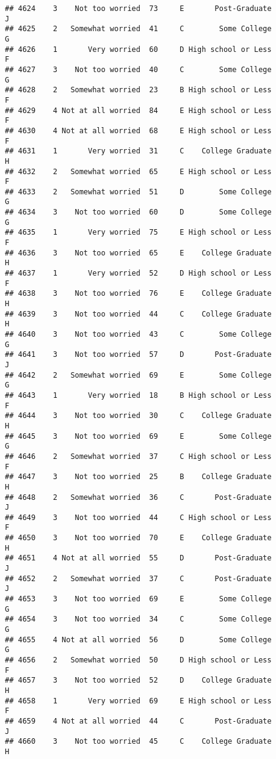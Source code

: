 \documentclass[
]{article}
\begin{document}
\begin{verbatim}
## 4624    3    Not too worried  73     E       Post-Graduate         J
## 4625    2   Somewhat worried  41     C        Some College         G
## 4626    1       Very worried  60     D High school or Less         F
## 4627    3    Not too worried  40     C        Some College         G
## 4628    2   Somewhat worried  23     B High school or Less         F
## 4629    4 Not at all worried  84     E High school or Less         F
## 4630    4 Not at all worried  68     E High school or Less         F
## 4631    1       Very worried  31     C    College Graduate         H
## 4632    2   Somewhat worried  65     E High school or Less         F
## 4633    2   Somewhat worried  51     D        Some College         G
## 4634    3    Not too worried  60     D        Some College         G
## 4635    1       Very worried  75     E High school or Less         F
## 4636    3    Not too worried  65     E    College Graduate         H
## 4637    1       Very worried  52     D High school or Less         F
## 4638    3    Not too worried  76     E    College Graduate         H
## 4639    3    Not too worried  44     C    College Graduate         H
## 4640    3    Not too worried  43     C        Some College         G
## 4641    3    Not too worried  57     D       Post-Graduate         J
## 4642    2   Somewhat worried  69     E        Some College         G
## 4643    1       Very worried  18     B High school or Less         F
## 4644    3    Not too worried  30     C    College Graduate         H
## 4645    3    Not too worried  69     E        Some College         G
## 4646    2   Somewhat worried  37     C High school or Less         F
## 4647    3    Not too worried  25     B    College Graduate         H
## 4648    2   Somewhat worried  36     C       Post-Graduate         J
## 4649    3    Not too worried  44     C High school or Less         F
## 4650    3    Not too worried  70     E    College Graduate         H
## 4651    4 Not at all worried  55     D       Post-Graduate         J
## 4652    2   Somewhat worried  37     C       Post-Graduate         J
## 4653    3    Not too worried  69     E        Some College         G
## 4654    3    Not too worried  34     C        Some College         G
## 4655    4 Not at all worried  56     D        Some College         G
## 4656    2   Somewhat worried  50     D High school or Less         F
## 4657    3    Not too worried  52     D    College Graduate         H
## 4658    1       Very worried  69     E High school or Less         F
## 4659    4 Not at all worried  44     C       Post-Graduate         J
## 4660    3    Not too worried  45     C    College Graduate         H

\end{verbatim}
\end{document}
